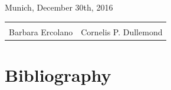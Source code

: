 \documentclass[10pt,fleqn,twoside]{article}
\begin{document}
\noindent Munich, December 30th, 2016\\[1em]

\noindent\begin{tabular}{p{5.5cm}p{5.5cm}}
\vspace{1em} & \\
Barbara Ercolano & Cornelis P. Dullemond \\
\end{tabular}
% 



%
\pagebreak[4]

%


\section{Bibliography}

\begingroup
\renewcommand{\section}[2]{}%


\endgroup
\end{document}
